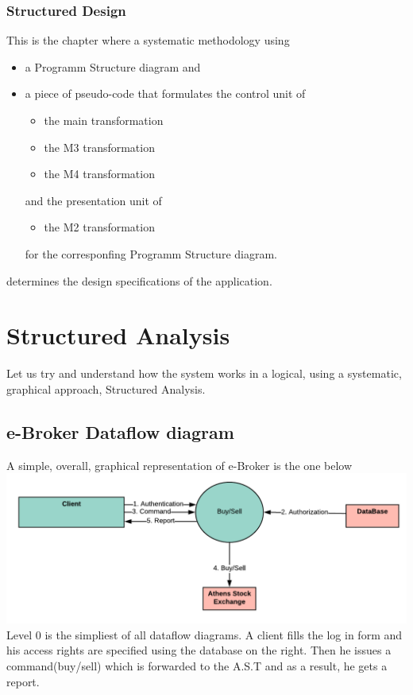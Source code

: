 \documentclass{article}
\begin{document}
\subsubsection{Structured Design}
This is the chapter where a systematic methodology using
\begin{itemize}
\item a Programm Structure diagram and 
\item a piece of pseudo-code that formulates the control unit of
\begin{itemize}[{label=$\circ$}]
\item the main transformation 
\item the M3 transformation 
\item the M4 transformation
\end{itemize}
and the presentation unit of
\begin{itemize}[{label=$\circ$}]
\item the M2 transformation 
\end{itemize}
for the corresponfing Programm Structure diagram.
\end{itemize}
determines the design specifications of the application. 

\newpage
\section{Structured Analysis}
Let us try and understand how the system works in a logical, using a systematic, graphical approach, Structured Analysis. 

\subsection{e-Broker Dataflow diagram}
A simple, overall, graphical representation of e-Broker is the one below\\
\hspace*{5mm}\includegraphics[scale=0.8]{dataflow_0.png}\\
Level 0 is the simpliest of all dataflow diagrams. A client fills the log in form and his access rights are specified
using the database on the right. Then he issues a command(buy/sell)
which is forwarded to the A.S.T and as a result, he gets a report.
\end{document}
